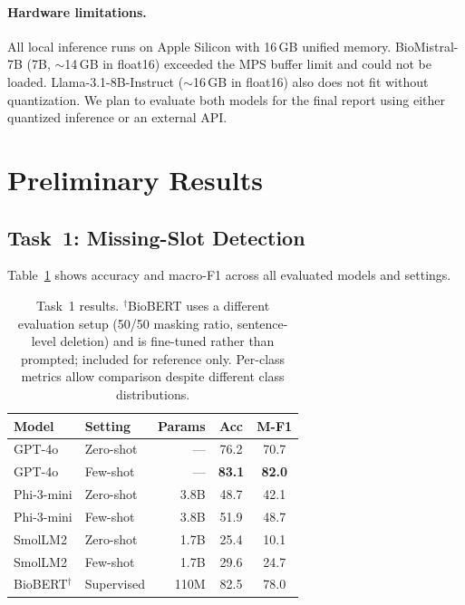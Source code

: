 \documentclass[11pt]{article}
\begin{document}
\paragraph{Hardware limitations.}
All local inference runs on Apple Silicon with 16\,GB unified memory.
BioMistral-7B (7B, $\sim$14\,GB in float16) exceeded the MPS buffer limit and could not be loaded.
Llama-3.1-8B-Instruct ($\sim$16\,GB in float16) also does not fit without quantization.
We plan to evaluate both models for the final report using either quantized inference or an external API.

\section{Preliminary Results}

\subsection{Task~1: Missing-Slot Detection}

Table~\ref{tab:task1} shows accuracy and macro-F1 across all evaluated models and settings.

\begin{table}[h]
\centering
\small
\begin{tabular}{llrcc}
\toprule
\textbf{Model} & \textbf{Setting} & \textbf{Params} & \textbf{Acc} & \textbf{M-F1} \\
\midrule
GPT-4o          & Zero-shot &       --- & 76.2 & 70.7 \\
GPT-4o          & Few-shot  &       --- & \textbf{83.1} & \textbf{82.0} \\
\midrule
Phi-3-mini      & Zero-shot &     3.8B & 48.7 & 42.1 \\
Phi-3-mini      & Few-shot  &     3.8B & 51.9 & 48.7 \\
\midrule
SmolLM2         & Zero-shot &     1.7B & 25.4 & 10.1 \\
SmolLM2         & Few-shot  &     1.7B & 29.6 & 24.7 \\
\midrule
BioBERT$^\dagger$  & Supervised &  110M & 82.5 & 78.0 \\
\bottomrule
\end{tabular}
\caption{Task~1 results. $^\dagger$BioBERT uses a different evaluation setup (50/50 masking ratio, sentence-level deletion) and is fine-tuned rather than prompted; included for reference only. Per-class metrics allow comparison despite different class distributions.}
\label{tab:task1}
\end{table}
\end{document}
